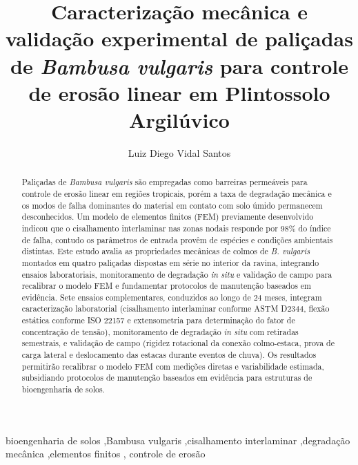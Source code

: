 \documentclass[
  brazilian,
  authoryear,
  preprint]{elsarticle}
\begin{document}
\begin{frontmatter}
\title{Caracterização mecânica e validação experimental de paliçadas de
\emph{Bambusa vulgaris} para controle de erosão linear em Plintossolo
Argilúvico}
\author[1]{Luiz Diego Vidal Santos%
%
}



        
\begin{abstract}
Paliçadas de \emph{Bambusa vulgaris} são empregadas como barreiras
permeáveis para controle de erosão linear em regiões tropicais, porém a
taxa de degradação mecânica e os modos de falha dominantes do material
em contato com solo úmido permanecem desconhecidos. Um modelo de
elementos finitos (FEM) previamente desenvolvido indicou que o
cisalhamento interlaminar nas zonas nodais responde por 98\% do índice
de falha, contudo os parâmetros de entrada provêm de espécies e
condições ambientais distintas. Este estudo avalia as propriedades
mecânicas de colmos de \emph{B. vulgaris} montados em quatro paliçadas
dispostas em série no interior da ravina, integrando ensaios
laboratoriais, monitoramento de degradação \emph{in situ} e validação de
campo para recalibrar o modelo FEM e fundamentar protocolos de
manutenção baseados em evidência. Sete ensaios complementares,
conduzidos ao longo de 24 meses, integram caracterização laboratorial
(cisalhamento interlaminar conforme ASTM D2344, flexão estática conforme
ISO 22157 e extensometria para determinação do fator de concentração de
tensão), monitoramento de degradação \emph{in situ} com retiradas
semestrais, e validação de campo (rigidez rotacional da conexão
colmo-estaca, prova de carga lateral e deslocamento das estacas durante
eventos de chuva). Os resultados permitirão recalibrar o modelo FEM com
medições diretas e variabilidade estimada, subsidiando protocolos de
manutenção baseados em evidência para estruturas de bioengenharia de
solos.
\end{abstract}





\begin{keyword}
    bioengenharia de solos \sep Bambusa vulgaris \sep cisalhamento
interlaminar \sep degradação mecânica \sep elementos finitos \sep 
    controle de erosão
\end{keyword}
\end{frontmatter}
    
\end{document}
